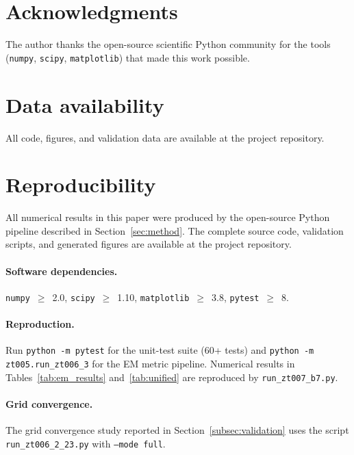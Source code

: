 \documentclass[11pt,a4paper,twocolumn]{article}
\begin{document}
\section*{Acknowledgments}
The author thanks the open-source scientific Python community for
the tools (\texttt{numpy}, \texttt{scipy}, \texttt{matplotlib})
that made this work possible.

\section*{Data availability}
All code, figures, and validation data are available at the
project repository.





\appendix
\section{Reproducibility}
\label{app:repro}

All numerical results in this paper were produced by the open-source
Python pipeline described in Section~\ref{sec:method}. The complete
source code, validation scripts, and generated figures are available
at the project repository.

\paragraph{Software dependencies.}
\texttt{numpy}~$\geq$~2.0, \texttt{scipy}~$\geq$~1.10,
\texttt{matplotlib}~$\geq$~3.8, \texttt{pytest}~$\geq$~8.

\paragraph{Reproduction.}
Run \texttt{python -m pytest} for the unit-test suite (60+ tests)
and \texttt{python -m zt005.run\_zt006\_3} for the EM metric
pipeline. Numerical results in Tables~\ref{tab:em_results}
and~\ref{tab:unified} are reproduced by
\texttt{run\_zt007\_b7.py}.

\paragraph{Grid convergence.}
The grid convergence study reported in Section~\ref{subsec:validation}
uses the script \texttt{run\_zt006\_2\_23.py} with \texttt{--mode full}.
\end{document}
